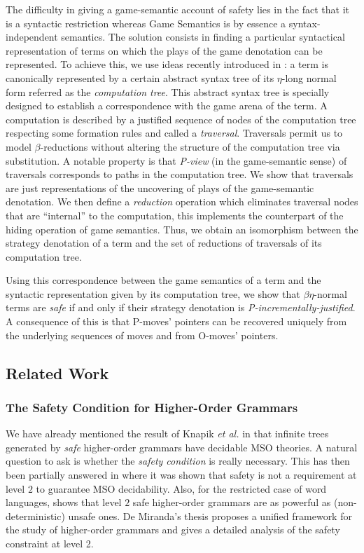 \documentclass{llncs}
\begin{document}
The difficulty in giving a game-semantic account of safety lies in the fact that it is a syntactic restriction whereas Game Semantics is by essence a syntax-independent semantics. The solution consists in finding a particular syntactical representation of terms on which the plays of the game denotation can be represented.
To achieve this, we use ideas recently introduced in \cite{OngLics2006}: a term is canonically represented by a certain abstract syntax tree of its $\eta$-long normal form referred as the \emph{computation tree}. This abstract syntax tree is specially designed to establish a correspondence with the game arena of the term. A computation is described by a justified sequence of nodes of the computation tree respecting some formation rules and called a \emph{traversal}. Traversals permit us to model $\beta$-reductions without altering the structure of the computation tree via substitution. A notable property is that \emph{P-view} (in the game-semantic sense) of traversals corresponds to paths in the computation tree.
We show that traversals are just representations of the uncovering of plays of the game-semantic denotation. We then define a \emph{reduction} operation which eliminates traversal nodes that are ``internal'' to the computation, this implements the counterpart of the hiding operation of game semantics. Thus, we obtain an isomorphism between the strategy denotation of a term and the set of reductions of traversals of its computation tree.

Using this correspondence between the game semantics of a term and the syntactic representation given by its computation tree, we show that $\beta\eta$-normal terms are \emph{safe} if and only if their strategy denotation is \emph{P-incrementally-justified}. A consequence of this is that P-moves' pointers can be recovered uniquely from the underlying sequences of moves and from O-moves' pointers.

\subsection{Related Work}

\subsubsection{The Safety Condition for Higher-Order Grammars}

We have already mentioned the result of Knapik \emph{et al.} in \cite{KNU02} that infinite trees generated by \emph{safe} higher-order grammars have decidable MSO theories. 
A natural question to ask is whether the \emph{safety condition} is really necessary. 
This has then been partially answered in \cite{DBLP:conf/tlca/AehligMO05} where it was shown that safety is not a requirement at level $2$ to guarantee MSO decidability. Also, for the restricted case of word languages, \cite{DBLP:conf/fossacs/AehligMO05} shows that level $2$ safe higher-order grammars are as powerful as (non-deterministic) unsafe ones. 
De Miranda's thesis \cite{demirandathesis} proposes a unified framework for the study of higher-order grammars and gives a detailed analysis of the safety constraint at level 2.
\end{document}
